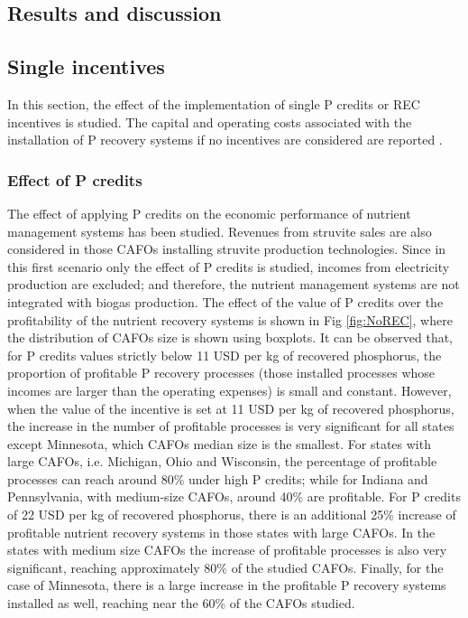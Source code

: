 \begin{refsection}[referencesCh5]
\section{Results and discussion}
\subsection{Single incentives}
In this section, the effect of the implementation of single P credits or REC incentives is studied. The capital and operating costs associated with the installation of P recovery systems if no incentives are considered are reported \citet{Tool}.

\subsubsection{Effect of P credits}
The effect of applying P credits on the economic performance of nutrient management systems has been studied. Revenues from struvite sales are also considered in those CAFOs installing struvite production technologies. Since in this first scenario only the effect of P credits is studied, incomes from electricity production are excluded; and therefore, the nutrient management systems are not integrated with biogas production. The effect of the value of P credits over the profitability of the nutrient recovery systems is shown in Fig \ref{fig:NoREC}, where the distribution of CAFOs size is shown using boxplots. It can be observed that, for P credits values strictly below 11 USD per kg of recovered phosphorus, the proportion of profitable P recovery processes (those installed processes whose incomes are larger than the operating expenses) is small and constant. However, when the value of the incentive is set at 11 USD per kg of recovered phosphorus, the increase in the number of profitable processes is very significant for all states except Minnesota, which CAFOs median size is the smallest. For states with large CAFOs, i.e. Michigan, Ohio and Wisconsin, the percentage of profitable processes can reach around 80\% under high P credits; while for Indiana and Pennsylvania, with medium-size CAFOs, around 40\% are profitable. For P credits of 22 USD per kg of recovered phosphorus, there is an additional 25\% increase of profitable nutrient recovery systems in those states with large CAFOs. In the states with medium size CAFOs the increase of profitable processes is also very significant, reaching approximately 80\% of the studied CAFOs. Finally, for the case of Minnesota, there is a large increase in the profitable P recovery systems installed as well, reaching near the 60\% of the CAFOs studied.


\end{refsection}
